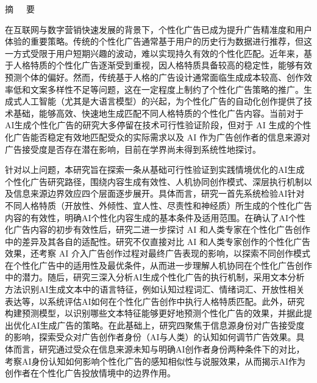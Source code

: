 \clearpage
\pagestyle{abstractstyle}     %
\thispagestyle{abstractstyle} %


\begin{center}
    {\heiti \fontsize{16pt}{16pt}\selectfont 摘\ \ \ 要}
\end{center}


在互联网与数字营销快速发展的背景下，个性化广告已成为提升广告精准度和用户体验的重要策略。传统的个性化广告通常基于用户的历史行为数据进行推荐，但这一方式受限于用户短期兴趣的波动，难以实现持久有效的个性化匹配。近年来，基于人格特质的个性化广告逐渐受到重视，因人格特质具备较高的稳定性，能够有效预测个体的偏好。然而，传统基于人格的广告设计通常面临生成成本较高、创作效率低和文案多样性不足等问题，这在一定程度上制约了个性化广告策略的推广。生成式人工智能（尤其是大语言模型）的兴起，为个性化广告的自动化创作提供了技术基础，能够高效、快速地生成匹配不同人格特质的个性化广告内容。当前对于AI生成个性化广告的研究大多停留在技术可行性验证阶段，但对于 AI 生成的个性化广告能否稳定有效地匹配受众的实际需求以及 AI 作为广告创作者的信息来源对广告接受度是否存在潜在影响，目前在学界尚未得到系统性地探讨。

针对以上问题，本研究旨在探索一条从基础可行性验证到实践情境优化的AI生成个性化广告研究路径，围绕内容生成有效性、人机协同创作模式、深层执行机制以及信息来源边界效应四个层面逐步展开。具体而言，研究一首先系统检验AI针对不同人格特质（开放性、外倾性、宜人性、尽责性和神经质）所生成的个性化广告内容的有效性，明确AI个性化内容生成的基本条件及适用范围。在确认了AI个性化广告内容的初步有效性后，研究二进一步探讨 AI 和人类专家在个性化广告创作中的差异及其各自的适配性。研究不仅直接对比 AI 和人类专家创作的个性化广告效果，还考察 AI 介入广告创作过程对最终广告表现的影响，以探索不同创作模式在个性化广告中的适用性及最优条件，从而进一步理解人机协同在个性化广告创作中的潜力。随后，研究三深入分析AI生成个性化广告的执行机制，采用文本分析方法识别AI生成文本中的语言特征，例如认知过程词汇、情绪词汇、开放性相关表达等，以系统评估AI如何在个性化广告创作中执行人格特质匹配。此外，研究构建预测模型，以识别哪些文本特征能够更好地预测个性化广告的效果，并据此提出优化AI生成广告的策略。在此基础上，研究四聚焦于信息源身份对广告接受度的影响，探索受众对广告创作者身份（AI与人类）的认知如何调节广告效果。具体而言，研究通过受众在信息来源未知与明确AI创作者身份两种条件下的对比，考察AI身份认知如何影响个性化广告的感知相似性与说服效果，从而揭示AI作为创作者在个性化广告投放情境中的边界作用。

